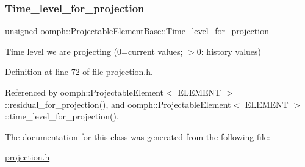 \subsubsection{\texorpdfstring{Time\+\_\+level\+\_\+for\+\_\+projection}{Time\_level\_for\_projection}}
{\footnotesize\ttfamily unsigned oomph\+::\+Projectable\+Element\+Base\+::\+Time\+\_\+level\+\_\+for\+\_\+projection\hspace{0.3cm}{\ttfamily [protected]}}



Time level we are projecting (0=current values; $>$0\+: history values) 



Definition at line 72 of file projection.\+h.



Referenced by oomph\+::\+Projectable\+Element$<$ E\+L\+E\+M\+E\+N\+T $>$\+::residual\+\_\+for\+\_\+projection(), and oomph\+::\+Projectable\+Element$<$ E\+L\+E\+M\+E\+N\+T $>$\+::time\+\_\+level\+\_\+for\+\_\+projection().



The documentation for this class was generated from the following file\+:\begin{DoxyCompactItemize}
\item 
\hyperlink{projection_8h}{projection.\+h}\end{DoxyCompactItemize}
